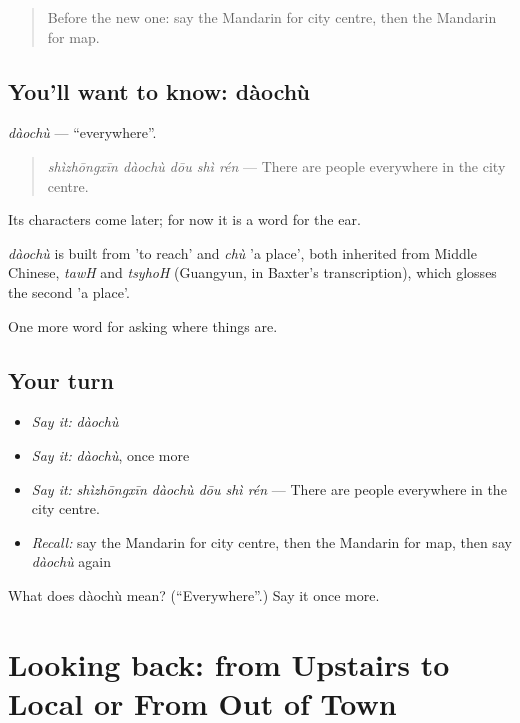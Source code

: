 \begin{quote}
Before the new one: say the Mandarin for city centre, then the Mandarin for map.
\end{quote}

\subsection*{You'll want to know: dàochù}
\emph{dàochù} — \textquotedblleft{}everywhere\textquotedblright{}.

\begin{quote}
\emph{shìzhōngxīn dàochù dōu shì rén} — There are people everywhere in the city centre.
\end{quote}

Its characters come later; for now it is a word for the ear.

\begin{cousinweb}
\emph{dàochù} is built from  'to reach' and \emph{chù} 'a place', both inherited from Middle Chinese, \emph{tawH} and \emph{tsyhoH} (Guangyun, in Baxter's transcription), which glosses the second 'a place'.
\end{cousinweb}

\begin{grammarlens}[title={What you've built}]
One more word for asking where things are.
\end{grammarlens}

\subsection*{Your turn}
\begin{itemize}
\raggedright
  \item \emph{Say it:} \emph{dàochù}
  \item \emph{Say it:} \emph{dàochù}, once more
  \item \emph{Say it:} \emph{shìzhōngxīn dàochù dōu shì rén} — There are people everywhere in the city centre.
  \item \emph{Recall:} say the Mandarin for city centre, then the Mandarin for map, then say \emph{dàochù} again
\end{itemize}

\begin{tcolorbox}[breakable,colback=teal!4,colframe=teal!35!black,title={Before you move on}]
What does dàochù mean? (\textquotedblleft{}Everywhere\textquotedblright{}.) Say it once more.
\end{tcolorbox}
\section[(dialogue)]{Looking back: from Upstairs to Local or From Out of Town}

